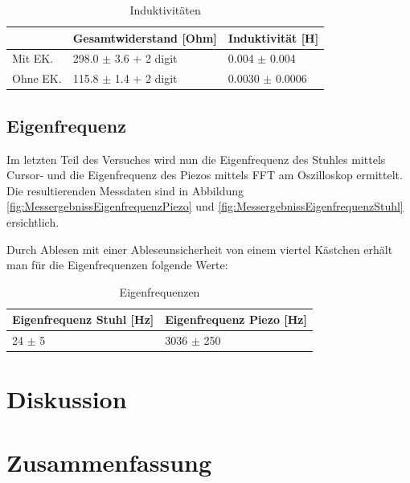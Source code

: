 \documentclass[12pt,a4paper,twoside]{article}
\begin{document}
\begin{table}[H]
    \centering
    \caption{Induktivitäten}
    \label{tab:Induktivitäten}
    \begin{tabular}{| l | l | l |}
        \hline
         & Gesamtwiderstand [Ohm] & Induktivität [H] \\
        \hline
        Mit EK. & 298.0 $\pm$ 3.6 + 2 digit & 0.004 $\pm$ 0.004 \\
        Ohne EK. & 115.8 $\pm$ 1.4 + 2 digit & 0.0030 $\pm$ 0.0006 \\
        \hline
    \end{tabular}
\end{table}


\subsection{Eigenfrequenz}

Im letzten Teil des Versuches wird nun die Eigenfrequenz des Stuhles mittels Cursor- und die Eigenfrequenz des Piezos mittels FFT am Oszilloskop ermittelt. Die resultierenden Messdaten sind in Abbildung \ref{fig:MessergebnissEigenfrequenzPiezo} und \ref{fig:MessergebnissEigenfrequenzStuhl} ersichtlich.

Durch Ablesen mit einer Ableseunsicherheit von einem viertel Kästchen erhält man für die Eigenfrequenzen folgende Werte:

\begin{table}[H]
    \centering
    \caption{Eigenfrequenzen}
    \label{tab:Eigenfrequenzen}
    \begin{tabular}{| l | l |}
        \hline
        Eigenfrequenz Stuhl [Hz] & Eigenfrequenz Piezo [Hz] \\
        \hline
        24 $\pm$ 5 & 3036 $\pm$ 250 \\
        \hline
    \end{tabular}
\end{table}


\section{Diskussion} %


\section{Zusammenfassung} %


\printbibliography[heading=bibintoc]
\end{document}
